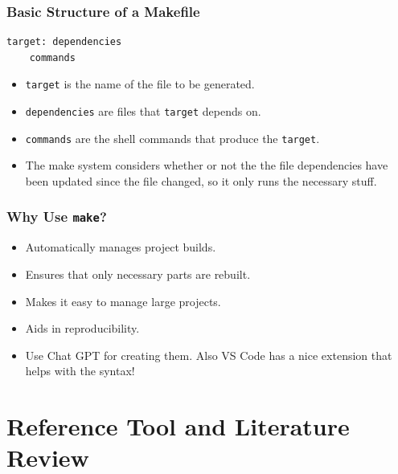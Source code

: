 \documentclass{beamer}
\begin{document}
\begin{frame}[fragile]
  \frametitle{Basic Structure of a Makefile}
  \begin{lstlisting}
target: dependencies
	commands
  \end{lstlisting}
  \begin{itemize}
    \item \texttt{target} is the name of the file to be generated.
    \item \texttt{dependencies} are files that \texttt{target} depends on.
    \item \texttt{commands} are the shell commands that produce the \texttt{target}.
    \item The make system considers whether or not the the file dependencies have been updated since the file changed, so it only runs the necessary stuff.
  \end{itemize}
\end{frame}

\begin{frame}
  \frametitle{Why Use \texttt{make}?}
  \begin{itemize}
    \item Automatically manages project builds.
    \item Ensures that only necessary parts are rebuilt.
    \item Makes it easy to manage large projects.
    \item Aids in reproducibility.
    \item Use Chat GPT for creating them. Also VS Code has a nice extension that helps with the syntax!
  \end{itemize}
\end{frame}

\section{Reference Tool and Literature Review}
\end{document}
